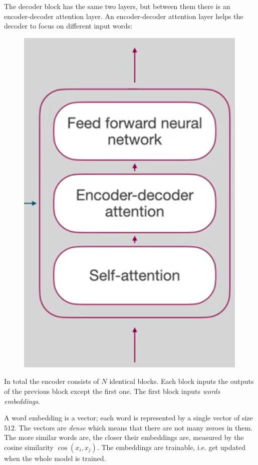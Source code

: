 The decoder block has the same two layers, but between them there is an encoder-decoder attention layer. An encoder-decoder attention layer helps the decoder to focus on different input words:
\begin{figure}[H]
\centering
\includegraphics[scale=0.2]{decoderblock.png}
\end{figure}

In total the encoder consists of $N$ identical blocks. Each block inputs the outputs of the previous block except the first one. The first block inputs \textit{words embeddings}.


\minirule

A word embedding is a vector; each word is represented by a single vector of size $512$. The vectors are \textit{dense} which means that there are not many zeroes in them.\\

The more similar words are, the closer their embeddings are, measured by the cosine similarity $\cos(x_i,x_j)$. The embeddings are trainable, i.e. get updated when the whole model is trained.\\

